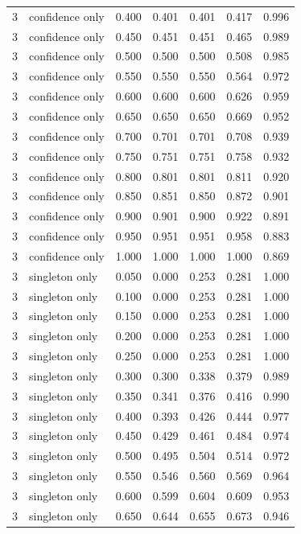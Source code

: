 \begin{tabular}{rlrrrrr}
3 & confidence only & 0.400 & 0.401 & 0.401 & 0.417 & 0.996 \\
3 & confidence only & 0.450 & 0.451 & 0.451 & 0.465 & 0.989 \\
3 & confidence only & 0.500 & 0.500 & 0.500 & 0.508 & 0.985 \\
3 & confidence only & 0.550 & 0.550 & 0.550 & 0.564 & 0.972 \\
3 & confidence only & 0.600 & 0.600 & 0.600 & 0.626 & 0.959 \\
3 & confidence only & 0.650 & 0.650 & 0.650 & 0.669 & 0.952 \\
3 & confidence only & 0.700 & 0.701 & 0.701 & 0.708 & 0.939 \\
3 & confidence only & 0.750 & 0.751 & 0.751 & 0.758 & 0.932 \\
3 & confidence only & 0.800 & 0.801 & 0.801 & 0.811 & 0.920 \\
3 & confidence only & 0.850 & 0.851 & 0.850 & 0.872 & 0.901 \\
3 & confidence only & 0.900 & 0.901 & 0.900 & 0.922 & 0.891 \\
3 & confidence only & 0.950 & 0.951 & 0.951 & 0.958 & 0.883 \\
3 & confidence only & 1.000 & 1.000 & 1.000 & 1.000 & 0.869 \\
3 & singleton only & 0.050 & 0.000 & 0.253 & 0.281 & 1.000 \\
3 & singleton only & 0.100 & 0.000 & 0.253 & 0.281 & 1.000 \\
3 & singleton only & 0.150 & 0.000 & 0.253 & 0.281 & 1.000 \\
3 & singleton only & 0.200 & 0.000 & 0.253 & 0.281 & 1.000 \\
3 & singleton only & 0.250 & 0.000 & 0.253 & 0.281 & 1.000 \\
3 & singleton only & 0.300 & 0.300 & 0.338 & 0.379 & 0.989 \\
3 & singleton only & 0.350 & 0.341 & 0.376 & 0.416 & 0.990 \\
3 & singleton only & 0.400 & 0.393 & 0.426 & 0.444 & 0.977 \\
3 & singleton only & 0.450 & 0.429 & 0.461 & 0.484 & 0.974 \\
3 & singleton only & 0.500 & 0.495 & 0.504 & 0.514 & 0.972 \\
3 & singleton only & 0.550 & 0.546 & 0.560 & 0.569 & 0.964 \\
3 & singleton only & 0.600 & 0.599 & 0.604 & 0.609 & 0.953 \\
3 & singleton only & 0.650 & 0.644 & 0.655 & 0.673 & 0.946 \\

\end{tabular}
